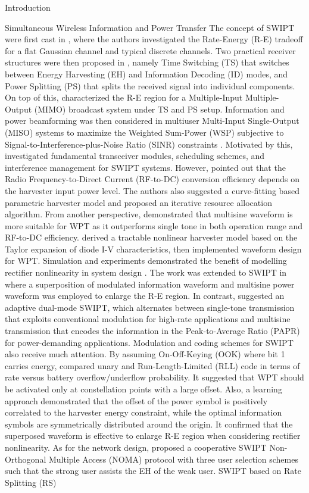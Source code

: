 \documentclass[journal]{IEEEtran}
\begin{document}
\begin{section}{Introduction}
\begin{subsection}{Simultaneous Wireless Information and Power Transfer}
			The concept of SWIPT were first cast in \cite{Varshney2008}, where the authors investigated the Rate-Energy (R-E) tradeoff for a flat Gaussian channel and typical discrete channels. Two practical receiver structures were then proposed in \cite{Zhou2013}, namely Time Switching (TS) that switches between Energy Harvesting (EH) and Information Decoding (ID) modes, and Power Splitting (PS) that splits the received signal into individual components. On top of this, \cite{Zhang2013} characterized the R-E region for a Multiple-Input Multiple-Output (MIMO) broadcast system under TS and PS setup. Information and power beamforming was then considered in multiuser Multi-Input Single-Output (MISO) systems to maximize the Weighted Sum-Power (WSP) subjective to Signal-to-Interference-plus-Noise Ratio (SINR) constraints \cite{Xu2014}. Motivated by this, \cite{Krikidis2014} investigated fundamental transceiver modules, scheduling schemes, and interference management for SWIPT systems. However, \cite{Boshkovska2015} pointed out that the Radio Frequency-to-Direct Current (RF-to-DC) conversion efficiency depends on the harvester input power level. The authors also suggested a curve-fitting based parametric harvester model and proposed an iterative resource allocation algorithm. From another perspective, \cite{Trotter2009,Boaventura2011} demonstrated that multisine waveform is more suitable for WPT as it outperforms single tone in both operation range and RF-to-DC efficiency. \cite{Clerckx2016a} derived a tractable nonlinear harvester model based on the Taylor expansion of diode I-V characteristics, then implemented waveform design for WPT. Simulation and experiments demonstrated the benefit of modelling rectifier nonlinearity in system design \cite{Kim2019,Kim2019a}. The work was extended to SWIPT in \cite{Clerckx2018} where a superposition of modulated information waveform and multisine power waveform was employed to enlarge the R-E region. In contrast, \cite{Park2018} suggested an adaptive dual-mode SWIPT, which alternates between single-tone transmission that exploits conventional modulation for high-rate applications and multisine transmission that encodes the information in the Peak-to-Average Ratio (PAPR) for power-demanding applications. Modulation and coding schemes for SWIPT also receive much attention. By assuming On-Off-Keying (OOK) where bit \num{1} carries energy, \cite{Hu2019} compared unary and Run-Length-Limited (RLL) code in terms of rate versus battery overflow/underflow probability. It suggested that WPT should be activated only at constellation points with a large offset. Also, a learning approach \cite{Varasteh2019c} demonstrated that the offset of the power symbol is positively correlated to the harvester energy constraint, while the optimal information symbols are symmetrically distributed around the origin. It confirmed that the superposed waveform is effective to enlarge R-E region when considering rectifier nonlinearity. As for the network design, \cite{Liu2016} proposed a cooperative SWIPT Non-Orthogonal Multiple Access (NOMA) protocol with three user selection schemes such that the strong user assists the EH of the weak user. SWIPT based on Rate Splitting (RS) 
\end{subsection}
\end{section}
\end{document}
